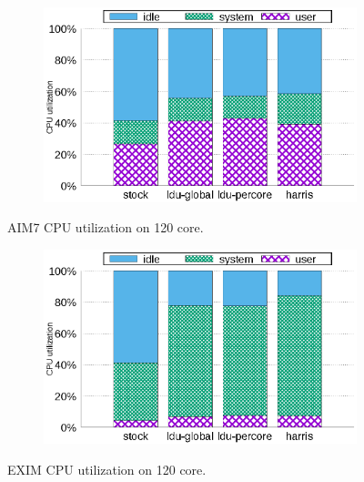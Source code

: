 \begin{figure}[tb]
    \centering
    \begin{subfigure}[b]{1\textwidth}
  \begin{center}
        \includegraphics[scale=0.8]{graph/aim7_cpuutils.eps}
  \end{center}
    \end{subfigure}%
    \centering
    \caption{AIM7 CPU utilization on 120 core.}
    \label{fig:utilization_aim7}
    
\end{figure}


\begin{figure}[tb]
    \centering
    \begin{subfigure}[b]{1\textwidth}
  \begin{center}
        \includegraphics[scale=0.8]{graph/exim_cpuutils.eps}
  \end{center}
    \end{subfigure}
    \centering
    \caption{EXIM CPU utilization on 120 core. }
    \label{fig:utilization_exim}
    
\end{figure}



